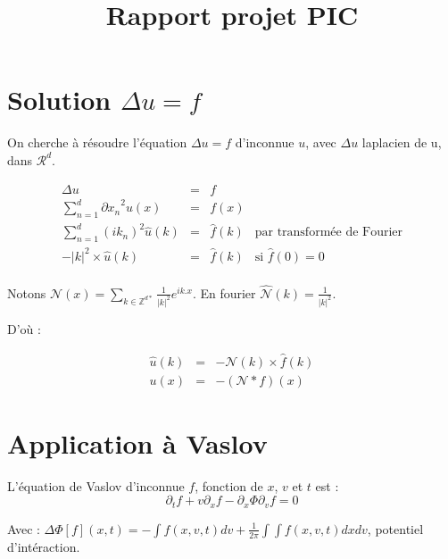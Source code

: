 \documentclass[a4paper,11pt]{article}
\title{Rapport projet PIC}
\begin{document}
\maketitle

\section{Solution $\Delta u = f$}
\label{delta u}

On cherche à résoudre l'équation $\Delta u = f$ d'inconnue $u$, avec $\Delta u$ laplacien de u, dans $\mathcal{R}^d$.

$$
\begin{array}{rclr}

\Delta u &=& f \\

\sum\limits_{n=1}^d {\partial x_n}^2 u(x) &=& f(x) \\

\sum\limits_{n=1}^d (ik_n)^2 \widehat{u}(k) &=& \widehat{f}(k) & \text{par transformée de Fourier} \\

-|k|^2 \times \widehat{u}(k) &=& \widehat{f}(k) & \text{si } \widehat{f}(0)=0 \\

\end{array}
$$

Notons $\mathcal{N} (x) = \sum\limits _{k \in \mathbb{Z}^{d*}} \frac{1}{|k|^2} e^{ik.x}$. En fourier $\widehat{\mathcal{N}}(k) = \frac{1}{|k|^2}$.

D'où :

$$
\begin{array}{rclr}

\widehat{u} (k) &=& - \mathcal{N}(k) \times \widehat{f} (k) \\

u(x) &=& - (\mathcal{N} \ast f) (x)

\end{array}
$$

\section{Application à Vaslov}

L'équation de Vaslov d'inconnue $f$, fonction de $x$, $v$ et $t$ est :
$$
\partial_t f + v \partial_x f - \partial_ x \Phi \partial_v f = 0
$$

Avec : $\Delta \Phi [f](x,t) = - \int f(x,v,t) dv + \frac{1}{2 \pi} \int \int f(x, v , t) dx dv$, potentiel d'intéraction.
\end{document}
